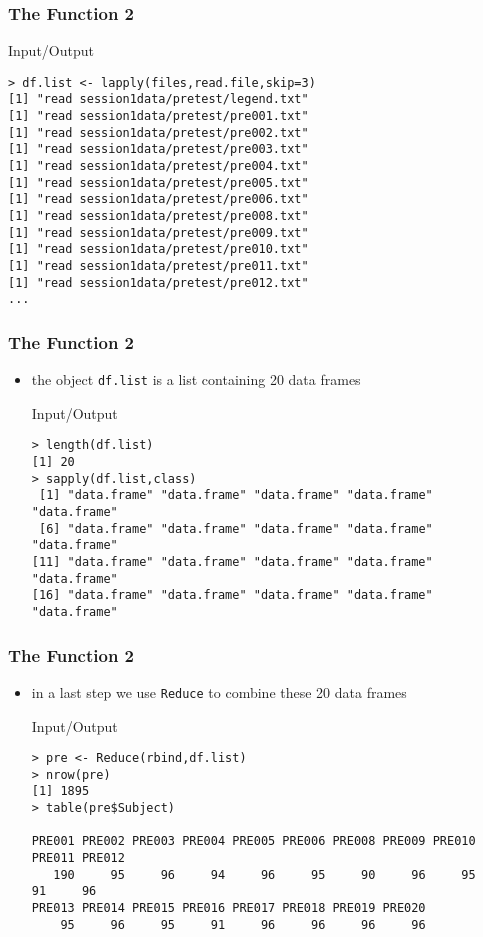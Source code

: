 \documentclass[xcolor={table},c]{beamer}
\begin{document}
\begin{frame}[fragile]\frametitle{The Function 2}
  \begin{exampleblock}{Input/Output}\footnotesize
\begin{verbatim}
> df.list <- lapply(files,read.file,skip=3)
[1] "read session1data/pretest/legend.txt"
[1] "read session1data/pretest/pre001.txt"
[1] "read session1data/pretest/pre002.txt"
[1] "read session1data/pretest/pre003.txt"
[1] "read session1data/pretest/pre004.txt"
[1] "read session1data/pretest/pre005.txt"
[1] "read session1data/pretest/pre006.txt"
[1] "read session1data/pretest/pre008.txt"
[1] "read session1data/pretest/pre009.txt"
[1] "read session1data/pretest/pre010.txt"
[1] "read session1data/pretest/pre011.txt"
[1] "read session1data/pretest/pre012.txt"
...
\end{verbatim}
  \end{exampleblock}
\end{frame}


\begin{frame}[fragile]\frametitle{The Function 2}
  \begin{itemize}
  \item the object \texttt{df.list} is a list containing 20 data frames
    \begin{exampleblock}{Input/Output}\scriptsize
\begin{verbatim}
> length(df.list)
[1] 20
> sapply(df.list,class)
 [1] "data.frame" "data.frame" "data.frame" "data.frame" "data.frame"
 [6] "data.frame" "data.frame" "data.frame" "data.frame" "data.frame"
[11] "data.frame" "data.frame" "data.frame" "data.frame" "data.frame"
[16] "data.frame" "data.frame" "data.frame" "data.frame" "data.frame"  
\end{verbatim}
    \end{exampleblock}
  \end{itemize}
\end{frame}


\begin{frame}[fragile]\frametitle{The Function 2}
  \begin{itemize}
  \item in a last step we use \texttt{Reduce{}} to combine these 20 data frames
    \begin{exampleblock}{Input/Output}\scriptsize
\begin{verbatim}
> pre <- Reduce(rbind,df.list)
> nrow(pre)
[1] 1895
> table(pre$Subject)

PRE001 PRE002 PRE003 PRE004 PRE005 PRE006 PRE008 PRE009 PRE010 PRE011 PRE012 
   190     95     96     94     96     95     90     96     95     91     96 
PRE013 PRE014 PRE015 PRE016 PRE017 PRE018 PRE019 PRE020 
    95     96     95     91     96     96     96     96 
\end{verbatim}
    \end{exampleblock}
  \end{itemize}
\end{frame}
\end{document}
